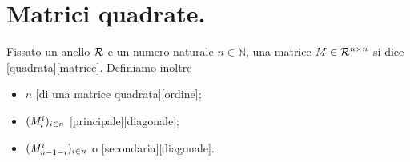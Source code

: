 \section{Matrici quadrate.}
\label{Matrici_MatriciQuadrate}
\begin{Definition}
	Fissato un anello $\mathcal{R}$ e un numero naturale $n \in \mathbb{N}$, una matrice $\mathit{M} \in \mathcal{R}^{n \times n}$ si dice [quadrata][matrice]. Definiamo inoltre
	\begin{itemize}
		\item $n$ [di una matrice quadrata][ordine];
		\item $(\mathit{M}_i^i)_{i \in n}$ [principale][diagonale];
		\item $(\mathit{M}_{n - 1 - i}^i)_{i \in n}$  o [secondaria][diagonale].
	\end{itemize}
\end{Definition}
